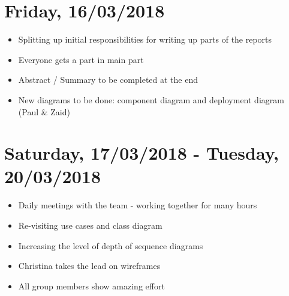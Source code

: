 \section{Friday, 16/03/2018}
\begin{itemize}
    \item Splitting up initial responsibilities for writing up parts of the reports
    \item Everyone gets a part in main part
    \item Abstract / Summary to be completed at the end
    \item New diagrams to be done: component diagram and deployment diagram (Paul \& Zaid)
\end{itemize}

\section{Saturday, 17/03/2018 - Tuesday, 20/03/2018}
\begin{itemize}
    \item Daily meetings with the team - working together for many hours
    \item Re-visiting use cases and class diagram
    \item Increasing the level of depth of sequence diagrams
    \item Christina takes the lead on wireframes
    \item All group members show amazing effort
\end{itemize}